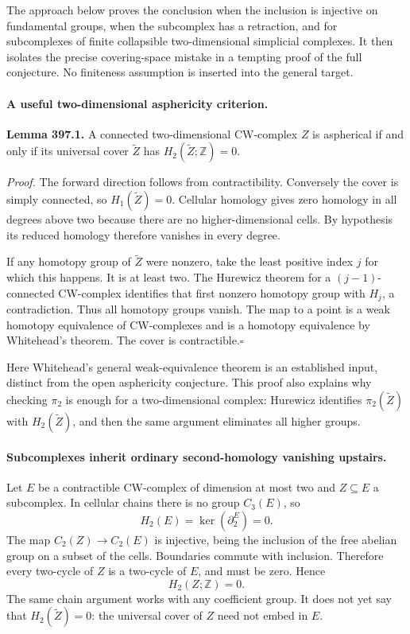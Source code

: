\documentclass[11pt]{article}
\begin{document}
The approach below proves the conclusion when the inclusion is injective
on fundamental groups, when the subcomplex has a retraction, and for
subcomplexes of finite collapsible two-dimensional simplicial complexes.
It then isolates the precise covering-space mistake in a tempting proof
of the full conjecture. No finiteness assumption is inserted into the
general target.

\paragraph{A useful two-dimensional asphericity criterion.}
\textbf{Lemma 397.1.} A connected two-dimensional CW-complex $Z$ is
aspherical if and only if its universal cover $\widetilde Z$ has
$H_2(\widetilde Z;\mathbb Z)=0$.

\emph{Proof.} The forward direction follows from contractibility.
Conversely the cover is simply connected, so $H_1(\widetilde Z)=0$.
Cellular homology gives zero homology in all degrees above two because
there are no higher-dimensional cells. By hypothesis its reduced
homology therefore vanishes in every degree.

If any homotopy group of $\widetilde Z$ were nonzero, take the least
positive index $j$ for which this happens. It is at least two. The
Hurewicz theorem for a $(j-1)$-connected CW-complex identifies that
first nonzero homotopy group with $H_j$, a contradiction. Thus all
homotopy groups vanish. The map to a point is a weak homotopy equivalence
of CW-complexes and is a homotopy equivalence by Whitehead's theorem.
The cover is contractible.\hfill$\square$

Here Whitehead's general weak-equivalence theorem is an established
input, distinct from the open asphericity conjecture. This proof also
explains why checking $\pi_2$ is enough for a two-dimensional complex:
Hurewicz identifies $\pi_2(\widetilde Z)$ with $H_2(\widetilde Z)$,
and then the same argument eliminates all higher groups.

\paragraph{Subcomplexes inherit ordinary second-homology vanishing upstairs.}
Let $E$ be a contractible CW-complex of dimension at most two and
$Z\subseteq E$ a subcomplex. In cellular chains there is no group
$C_3(E)$, so
\[
 H_2(E)=\ker(\partial_2^E)=0.
\]
The map $C_2(Z)\to C_2(E)$ is injective, being the inclusion of the
free abelian group on a subset of the cells. Boundaries commute with
inclusion. Therefore every two-cycle of $Z$ is a two-cycle of $E$,
and must be zero. Hence
\[
 H_2(Z;\mathbb Z)=0.
 \tag{397.1}
\]
The same chain argument works with any coefficient group. It does
not yet say that $H_2(\widetilde Z)=0$: the universal cover of $Z$
need not embed in $E$.
\end{document}
